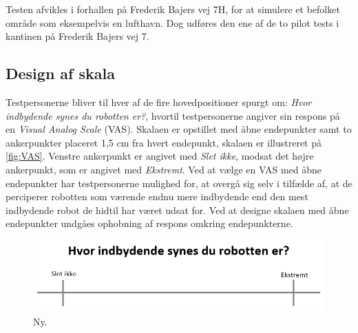 \noindent
%
Testen afvikles i forhallen på Frederik Bajers vej 7H, for at simulere et befolket område som eksempelvis en lufthavn. Dog udføres den ene af de to pilot tests i kantinen på Frederik Bajers vej 7.
%

\subsection*{Design af skala}
%
Testpersonerne bliver til hver af de fire hovedpositioner spurgt om: \textit{Hvor indbydende synes du robotten er?}, hvortil testpersonerne angiver sin respons på en \textit{Visual Analog Scale} (VAS). Skalaen er opstillet med åbne endepunkter samt to ankerpunkter placeret 1,5 cm fra hvert endepunkt, skalaen er illustreret på \autoref{fig:VAS}. Venstre ankerpunkt er angivet med \textit{Slet ikke}, modsat det højre ankerpunkt, som er angivet med \textit{Ekstremt}. Ved at vælge en VAS med åbne endepunkter har testpersonerne mulighed for, at overgå sig selv i tilfælde af, at de perciperer robotten som værende endnu mere indbydende end den mest indbydende robot de hidtil har været udsat for. Ved at designe skalaen med åbne endepunkter undgåes ophobning af respons omkring endepunkterne. 
%
\begin{figure}[H]
\centering
\includegraphics[width = \textwidth]{Figure/VAS.PNG} 
\caption{Ny.}
\label{fig:VAS}
\end{figure}
\noindent 
%










